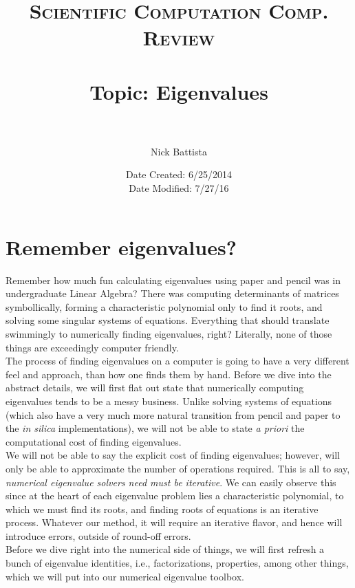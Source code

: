 \documentclass[paper=a4, fontsize=11pt]{scrartcl} %
\title{	
\normalfont \normalsize 
\textsc{Scientific Computation Comp. Review} \\ [25pt] %
\horrule{1pt} \\[0.05cm] %
\huge Topic: Eigenvalues \\ %
\horrule{1pt} \\[0.05cm] %
}
\author{Nick Battista} %
\date{\normalsize Date Created: 6/25/2014 \\ Date Modified: 7/27/16} %
\numberwithin{equation}{section} %
\numberwithin{figure}{section} %
\numberwithin{table}{section} %
\begin{document}
\maketitle %

%
%

\section{Remember eigenvalues?}

Remember how much fun calculating eigenvalues using paper and pencil was in undergraduate Linear Algebra? There was computing determinants of matrices symbollically, forming a characteristic polynomial only to find it roots, and solving some singular systems of equations. Everything that should translate swimmingly to numerically finding eigenvalues, right? Literally, none of those things are exceedingly computer friendly.\\

The process of finding eigenvalues on a computer is going to have a very different feel and approach, than how one finds them by hand. Before we dive into the abstract details, we will first flat out state that numerically computing eigenvalues tends to be a messy business. Unlike solving systems of equations (which also have a very much more natural transition from pencil and paper to the \emph{in silica} implementations), we will not be able to state \emph{a priori} the computational cost of finding eigenvalues. \\

We will not be able to say the explicit cost of finding eigenvalues; however, will only be able to approximate the number of operations required. This is all to say, \emph{numerical eigenvalue solvers need must be iterative}. We can easily observe this since at the heart of each eigenvalue problem lies a characteristic polynomial, to which we must  find its roots, and finding roots of equations is an iterative process. Whatever our method, it will require an iterative flavor, and hence will introduce errors, outside of round-off errors. \\

Before we dive right into the numerical side of things, we will first refresh a bunch of eigenvalue identities, i.e., factorizations, properties, among other things, which we will put into our numerical eigenvalue toolbox. \\
\end{document}
